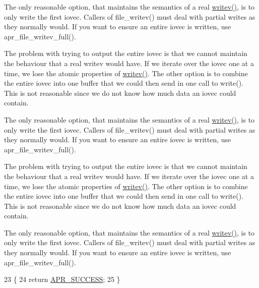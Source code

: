 The only reasonable option, that maintains the semantics of a real \hyperlink{apr__arch__os2calls_8h_a3d0f3996136a9b5ab46431c60c746efd}{writev()}, is to only write the first iovec. Callers of file\+\_\+writev() must deal with partial writes as they normally would. If you want to ensure an entire iovec is written, use apr\+\_\+file\+\_\+writev\+\_\+full().

The problem with trying to output the entire iovec is that we cannot maintain the behaviour that a real writev would have. If we iterate over the iovec one at a time, we lose the atomic properties of \hyperlink{apr__arch__os2calls_8h_a3d0f3996136a9b5ab46431c60c746efd}{writev()}. The other option is to combine the entire iovec into one buffer that we could then send in one call to write(). This is not reasonable since we do not know how much data an iovec could contain.

The only reasonable option, that maintains the semantics of a real \hyperlink{apr__arch__os2calls_8h_a3d0f3996136a9b5ab46431c60c746efd}{writev()}, is to only write the first iovec. Callers of file\+\_\+writev() must deal with partial writes as they normally would. If you want to ensure an entire iovec is written, use apr\+\_\+file\+\_\+writev\+\_\+full().

The problem with trying to output the entire iovec is that we cannot maintain the behaviour that a real writev would have. If we iterate over the iovec one at a time, we lose the atomic properties of \hyperlink{apr__arch__os2calls_8h_a3d0f3996136a9b5ab46431c60c746efd}{writev()}. The other option is to combine the entire iovec into one buffer that we could then send in one call to write(). This is not reasonable since we do not know how much data an iovec could contain.

The only reasonable option, that maintains the semantics of a real \hyperlink{apr__arch__os2calls_8h_a3d0f3996136a9b5ab46431c60c746efd}{writev()}, is to only write the first iovec. Callers of file\+\_\+writev() must deal with partial writes as they normally would. If you want to ensure an entire iovec is written, use apr\+\_\+file\+\_\+writev\+\_\+full().
\begin{DoxyCode}
23 \{
24     \textcolor{keywordflow}{return} \hyperlink{group__apr__errno_ga9ee311b7bf1c691dc521d721339ee2a6}{APR\_SUCCESS};
25 \}
\end{DoxyCode}


